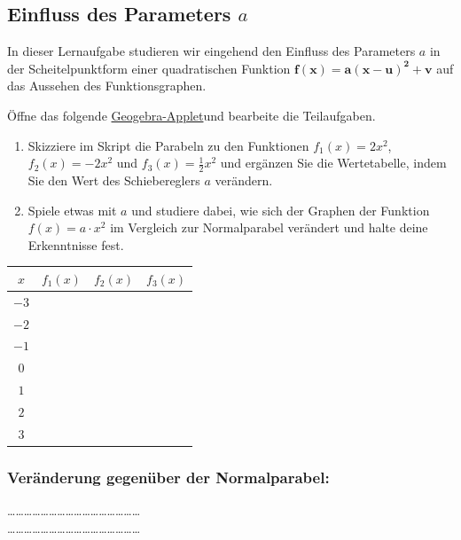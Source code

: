 \documentclass[11pt,oneside]{article}
\begin{document}
\subsection{Einfluss des Parameters $a$}
	In dieser Lernaufgabe studieren wir eingehend den Einfluss des Parameters $a$ in der Scheitelpunktform einer quadratischen Funktion $\mathbf{f(x)=a(x-u)^2+v}$ auf das Aussehen des Funktionsgraphen.
	\begin{aufgabe}
		Öffne das folgende \href{https://www.geogebra.org/m/yaknzg2e}{Geogebra-Applet}\footnotemark\:und bearbeite die Teilaufgaben.
		\begin{enumerate}[label=\alph*)]
			\item Skizziere im Skript die Parabeln zu den Funktionen $f_1(x)=2x^2$, $f_2(x)=-2x^2$ und $f_3(x)=\frac{1}{2}x^2$ und ergänzen Sie die Wertetabelle, indem Sie den Wert des Schiebereglers $a$ verändern.
			\item Spiele etwas mit $a$ und studiere dabei, wie sich der Graphen der Funktion $f(x)=a\cdot x^2$ im Vergleich zur Normalparabel verändert und halte deine Erkenntnisse fest.
		\end{enumerate}
	\end{aufgabe}
	\vspace{0.5cm}
	\begin{minipage}{0.6\linewidth}
		\begingroup
		\renewcommand{\arraystretch}{1.5}
		\begin{tabular}{c||c|c|c}
			$x$ & $f_1(x)$& $f_2(x)$ & $f_3(x)$\\ \hline\hline
			$-3$ & & & \\ \hline
			$-2$ & & & \\ \hline
			$-1$ & & & \\ \hline
			$0$ & & & \\ \hline
			$1$ & & & \\ \hline
			$2$ & & & \\ \hline
			$3$ & & & \\
		\end{tabular}
		\endgroup
		\vspace{0.5cm}
	\subsubsection*{Veränderung gegenüber der Normalparabel:}
		\ldots\ldots\ldots\ldots\ldots\ldots\ldots\ldots\ldots\ldots\ldots\ldots\ldots\ldots\ldots\ldots\\
		\ldots\ldots\ldots\ldots\ldots\ldots\ldots\ldots\ldots\ldots\ldots\ldots\ldots\ldots\ldots\ldots
		\vspace{1.5cm}
	\end{minipage}
\end{document}
